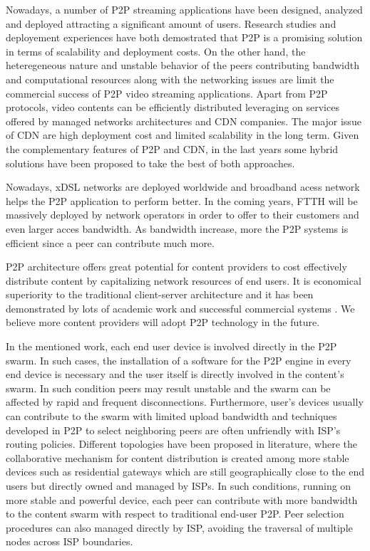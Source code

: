 \documentclass[paper]{ieice}
\begin{document}
Nowadays, a number of P2P streaming applications have been designed, analyzed and deployed attracting a significant amount of users.
Research studies and deployement experiences have both demostrated that P2P is a promising solution in terms of scalability and deployment costs.
On the other hand, the heteregeneous nature and unstable behavior of the peers contributing bandwidth and computational resources along with the networking issues are limit the commercial success of P2P video streaming applications.
Apart from P2P protocols, video contents can be efficiently distributed leveraging on services offered by managed networks architectures and CDN companies.
The major issue of CDN are high deployment cost and limited scalability in the long term.
Given the complementary features of P2P and CDN, in the last years some hybrid solutions have been proposed \cite{Huang:2008:UHC:1496046.1496064,4772628,Yin:2009:DDH:1631272.1631279} to take the best of both approaches.

Nowadays, xDSL networks are deployed worldwide and broadband acess network helps the P2P application to perform better.
In the coming years, FTTH will be massively deployed by network operators in order to offer to their customers and even larger acces bandwidth.
As bandwidth increase, more the P2P systems is efficient since a peer can contribute much more. 

P2P architecture offers great potential for content providers to cost effectively distribute content by capitalizing network resources of end users.
It is economical superiority to the traditional client-server architecture and it has been demonstrated by lots of academic work and successful commercial systems \cite{Yin:2009:DDH:1631272.1631279}.
We believe more content providers will adopt P2P technology in the future. 

In the mentioned work, each end user device is involved directly in the P2P swarm.
In such cases, the installation of a software for the P2P engine in every end device is necessary and the user itself is directly involved in the content's swarm.
In such condition peers may result unstable and the swarm can be affected by rapid and frequent disconnections.
Furthermore, user's devices usually can contribute to the swarm with limited upload bandwidth and techniques developed in P2P to select neighboring peers are often unfriendly with ISP's routing policies.
Different topologies have been proposed in literature, where the collaborative mechanism for content distribution is created among more stable devices such as residential gateways which are still geographically close to the end users but directly owned and managed by ISPs. 
In such conditions, running on more stable and powerful device, each peer can contribute with more bandwidth to the content swarm with respect to traditional end-user P2P. 
Peer selection procedures can also managed directly by ISP, avoiding the traversal of multiple nodes across ISP boundaries.
\end{document}
